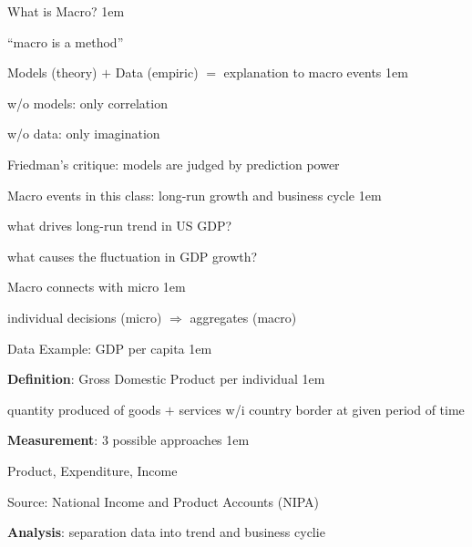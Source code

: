 \documentclass[11pt,aspectratio=43]{beamer}
\let\olditemize=\itemize
\let\endolditemize=\enditemize
\renewenvironment{itemize}{\olditemize \itemsep1em}{\endolditemize}
\theoremstyle{definition}
\begin{document}
\begin{frame}{What is Macro?}
\label{slide:What_is_Macro_}
    \begin{itemize}
        \item ``\alert{macro is a method}''
        \item Models (theory) $ + $ Data (empiric) $ = $ explanation to macro events
        \begin{itemize}
            \item w/o models: only \alert{correlation}
            \item w/o data: only \alert{imagination}
            \item \alert{Friedman's critique}: models are judged by \alert{prediction power}
        \end{itemize}
        \item Macro events in this class: \alert{long-run growth} and \alert{business cycle}
        \begin{itemize}
            \item what drives long-run trend in US GDP?
            \item what causes the fluctuation in GDP growth?
        \end{itemize}
        \item Macro connects with micro
        \begin{itemize}
            \item individual decisions (micro) $ \Rightarrow  $ aggregates (macro)
        \end{itemize}
    \end{itemize}
\end{frame}

\begin{frame}{Data Example: GDP per capita}
\label{slide:Data_Example__GDP}
    \begin{itemize}
        \item \textbf{Definition}: Gross Domestic Product \alert{per individual}
        \begin{itemize}
            \item quantity produced of \alert{goods $ + $ services} w/i country \alert{border} at given \alert{period of time}
        \end{itemize}
        \item \textbf{Measurement}: $ 3 $ possible approaches
        \begin{itemize}
            \item Product, Expenditure, Income
            \item Source: National Income and Product Accounts (NIPA)
        \end{itemize}
        \item \textbf{Analysis}: separation data into \alert{trend} and \alert{business cyclie}
    \end{itemize}
\end{frame}
\end{document}
